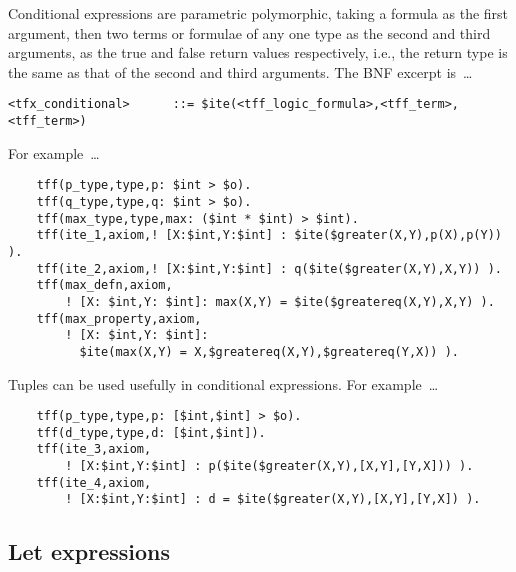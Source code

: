\documentclass{easychair}
\begin{document}
Conditional expressions are parametric polymorphic, taking a formula as the 
first argument, then two terms or formulae of any one type as the second and 
third arguments, as the true and false return values respectively, i.e., the 
return type is the same as that of the second and third arguments. 
The BNF excerpt is~\ldots
\begin{verbatim}
<tfx_conditional>      ::= $ite(<tff_logic_formula>,<tff_term>,<tff_term>)
\end{verbatim}
For example~\ldots
\begin{verbatim}
    tff(p_type,type,p: $int > $o).
    tff(q_type,type,q: $int > $o).
    tff(max_type,type,max: ($int * $int) > $int).
    tff(ite_1,axiom,! [X:$int,Y:$int] : $ite($greater(X,Y),p(X),p(Y)) ).
    tff(ite_2,axiom,! [X:$int,Y:$int] : q($ite($greater(X,Y),X,Y)) ).
    tff(max_defn,axiom,
        ! [X: $int,Y: $int]: max(X,Y) = $ite($greatereq(X,Y),X,Y) ).
    tff(max_property,axiom,
        ! [X: $int,Y: $int]: 
          $ite(max(X,Y) = X,$greatereq(X,Y),$greatereq(Y,X)) ).
\end{verbatim}
Tuples can be used usefully in conditional expressions. For example~\ldots
\begin{verbatim}
    tff(p_type,type,p: [$int,$int] > $o).
    tff(d_type,type,d: [$int,$int]).
    tff(ite_3,axiom,
        ! [X:$int,Y:$int] : p($ite($greater(X,Y),[X,Y],[Y,X])) ).
    tff(ite_4,axiom,
        ! [X:$int,Y:$int] : d = $ite($greater(X,Y),[X,Y],[Y,X]) ).
\end{verbatim}

\subsection{Let expressions}
\end{document}
